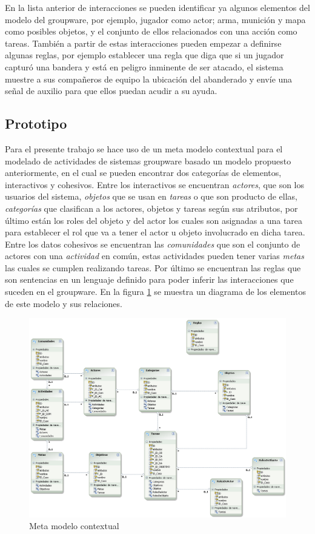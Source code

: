 En la lista anterior de interacciones se pueden identificar ya algunos elementos del modelo del groupware, por ejemplo, jugador como actor; arma, munici\'on y mapa como posibles objetos, y el conjunto de ellos relacionados con una acci\'on como tareas. Tambi\'en a partir de estas interacciones pueden empezar a definirse algunas reglas, por ejemplo establecer una regla que diga que si un jugador captur\'o una bandera y est\'a en peligro inminente de ser atacado, el sistema muestre a sus compa\~neros de equipo la ubicaci\'on del abanderado y env\'ie una se\~nal de auxilio para que ellos puedan acudir a su ayuda.

\subsection{Prototipo}
Para el presente trabajo se hace uso de un meta modelo contextual para el modelado de actividades de sistemas groupware basado un modelo propuesto anteriormente\cite{montane2013context}, en el cual se pueden encontrar dos categor\'ias de elementos, interactivos y cohesivos.  Entre los interactivos se encuentran \textit{actores}, que son los usuarios del sistema, \textit{objetos} que se usan en \textit{tareas} o que son producto de ellas, \textit{categor\'ias} que clasifican a los actores, objetos y tareas seg\'un sus atributos, por \'ultimo est\'an los roles del objeto y del actor los cuales son asignadas a una tarea para establecer el rol que va a tener el actor u objeto involucrado en dicha tarea. Entre los datos cohesivos se encuentran las \textit{comunidades} que son el conjunto de actores con una \textit{actividad} en com\'un, estas actividades pueden tener varias \textit{metas} las cuales se cumplen realizando tareas. Por \'ultimo se encuentran las reglas que son sentencias en un lenguaje definido para poder inferir las interacciones que suceden en el groupware. En la figura \ref{cmp:mmc} se muestra un diagrama de los elementos de este modelo y sus relaciones.

\begin{figure}[h!]
  \centering
    \includegraphics[scale=0.35]{images/modelo}
  \caption{Meta modelo contextual}
  \label{cmp:mmc}
\end{figure}

